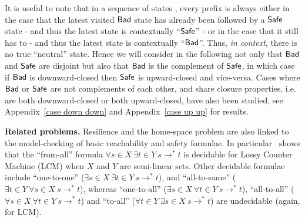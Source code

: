  





It is useful to note that in a sequence of states%
, every prefix is always 
either in the case that the latest visited $\textsf{Bad}$ state has already been followed by a 
$\textsf{Safe}$ state \-- and thus the latest state is contextually ``$\textsf{Safe}$'' \--
or in the case that it still has to \-- and thus the latest state is contextually ``$\textsf{Bad}$''. 
Thus, \emph{in context}, there is no true ``neutral'' state.
Hence we will consider in the following not only that $\textsf{Bad}$ and $\textsf{Safe}$ are disjoint but
	also
that $\textsf{Bad}$ is the complement of $\textsf{Safe}$,
in which case
if $\textsf{Bad}$ is downward-closed then $\textsf{Safe}$ is upward-closed and vice-versa.
Cases where $\textsf{Bad}$ or $\textsf{Safe}$ are not complements of each other, and share closure properties, i.e. are both downward-closed or both upward-closed,
have also been studied, 
see 
Appendix~\ref{case down down}
and
Appendix~\ref{case up up} for results.


{\bf Related problems.} 
Resilience and the home-space problem are also linked to the 
model-checking of basic reachability and safety formulae. 
In particular~\cite{DBLP:conf/rp/Schnoebelen10} shows that the ``from-all'' formula $\forall s \in X~ \exists t \in Y~ s \to^* t$
is decidable for Lossy Counter Machine (LCM)
when $X$ and $Y$ are semi-linear sets.
Other decidable formulae include ``one-to-one'' ($\exists s \in  X ~ \exists t \in  Y ~ s \to^* 
 t$), and ``all-to-same'' ($\exists t \in  Y ~ \forall s \in  X ~ s \to^*  t$),
whereas ``one-to-all'' ($\exists s \in  X ~ \forall t \in  Y ~ s \to^*  t$), 
``all-to-all'' ($\forall s \in  X ~ \forall t \in  Y ~ s \to^*  t$)
  and ``to-all'' ($\forall t \in  Y  ~ \exists s \in  X ~ s \to^*  t$) are undecidable (again, for LCM). 
  
